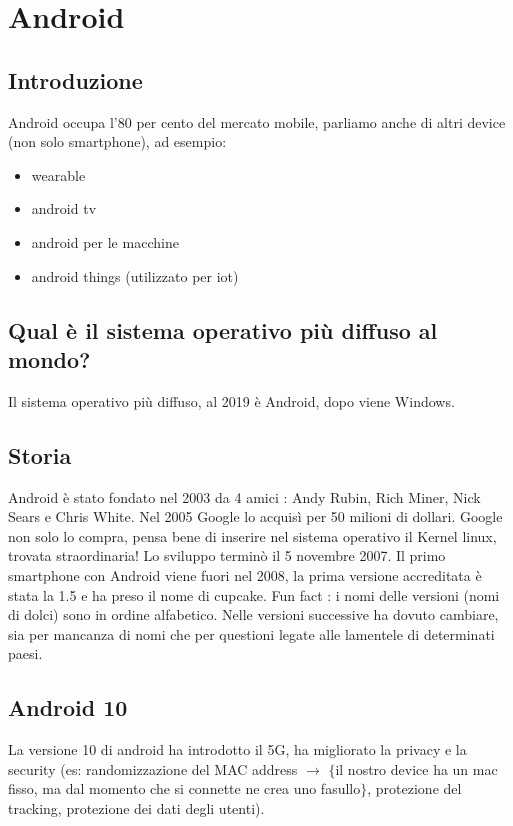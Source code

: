 \chapter{Android}

\section{Introduzione}

Android occupa l'80 per cento del mercato mobile, parliamo anche di altri device (non solo smartphone), ad esempio:
\begin{itemize}
	\item wearable
	\item android tv
	\item android per le macchine
	\item android things (utilizzato per iot)
\end{itemize}

\section{Qual è il sistema operativo più diffuso al mondo?}

Il sistema operativo più diffuso, al 2019 è Android, dopo viene Windows.

\section{Storia}

Android è stato fondato nel 2003 da 4 amici : Andy Rubin, Rich Miner, Nick Sears e Chris White. Nel 2005 Google lo acquisì per 50 milioni di dollari. Google non solo lo compra, pensa bene di inserire nel sistema operativo il Kernel linux, trovata straordinaria! Lo sviluppo terminò il 5 novembre 2007. Il primo smartphone con Android viene fuori nel 2008, la prima versione accreditata è stata la 1.5 e ha preso il nome di cupcake. Fun fact : i nomi delle versioni (nomi di dolci) sono in ordine alfabetico. Nelle versioni successive ha dovuto cambiare, sia per mancanza di nomi che per questioni legate alle lamentele di determinati paesi.

\section{Android 10}

La versione 10 di android ha introdotto il 5G, ha migliorato la privacy e la security (es: randomizzazione del MAC address $\rightarrow$ $\{$il nostro device ha un mac fisso, ma dal momento che si connette ne crea uno fasullo$\}$, protezione del tracking, protezione dei dati degli utenti). 

